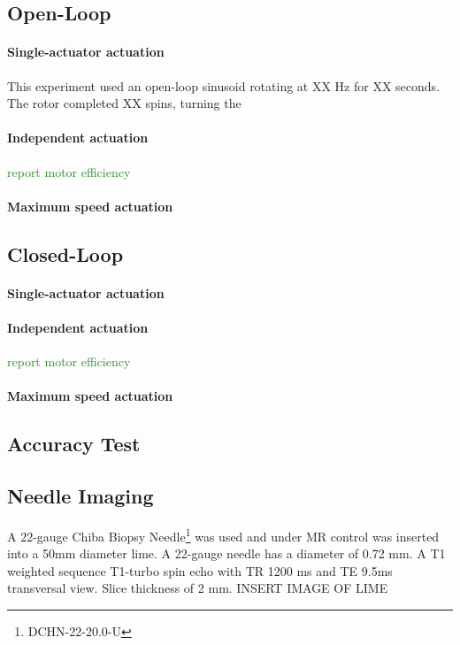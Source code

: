 \documentclass[letterpaper, 10 pt]{IEEEtran}
\newcommand{\todoAaron}[1]{\textcolor{ForestGreen}{#1}}
\begin{document}
    
\subsection{Open-Loop}
\paragraph{Single-actuator actuation}
This experiment used an open-loop sinusoid rotating at XX Hz for XX seconds.  The rotor completed XX spins, turning the 

\paragraph{Independent actuation}

\todoAaron{report motor efficiency }

\paragraph{Maximum speed actuation}


\subsection{Closed-Loop}
\paragraph{Single-actuator actuation}

\paragraph{Independent actuation}
\todoAaron{report motor efficiency }

\paragraph{Maximum speed actuation}

\subsection{Accuracy Test}

\subsection{Needle Imaging}

A 22-gauge Chiba Biopsy Needle\footnote{DCHN-22-20.0-U} was used and under MR control was inserted into a 50mm diameter lime.  A 22-gauge needle has a diameter of 0.72 mm.  A T1 weighted sequence T1-turbo spin echo with TR 1200 ms and TE 9.5ms transversal view. Slice thickness of 2 mm.
INSERT IMAGE OF LIME 
\end{document}
